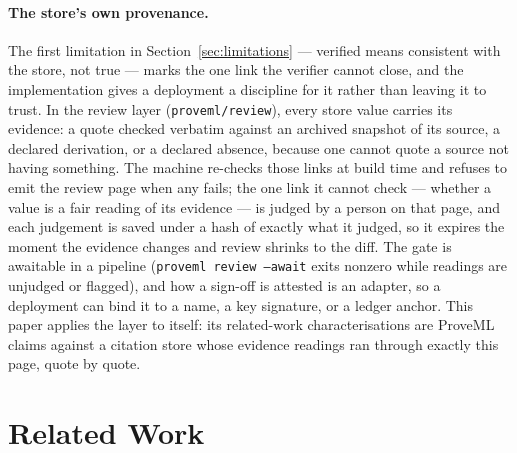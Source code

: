 \documentclass[11pt,a4paper]{article}
\begin{document}
\paragraph{The store's own provenance.} The first limitation in Section~\ref{sec:limitations} --- verified means consistent with the store, not true --- marks the one link the verifier cannot close, and the implementation gives a deployment a discipline for it rather than leaving it to trust. In the review layer (\texttt{proveml/review}), every store value carries its evidence: a quote checked verbatim against an archived snapshot of its source, a declared derivation, or a declared absence, because one cannot quote a source not having something. The machine re-checks those links at build time and refuses to emit the review page when any fails; the one link it cannot check --- whether a value is a fair reading of its evidence --- is judged by a person on that page, and each judgement is saved under a hash of exactly what it judged, so it expires the moment the evidence changes and review shrinks to the diff. The gate is awaitable in a pipeline (\texttt{proveml review --await} exits nonzero while readings are unjudged or flagged), and how a sign-off is attested is an adapter, so a deployment can bind it to a name, a key signature, or a ledger anchor. This paper applies the layer to itself: its related-work characterisations are ProveML claims against a citation store whose evidence readings ran through exactly this page, quote by quote.

\section{Related Work}
\label{sec:related}
\end{document}
